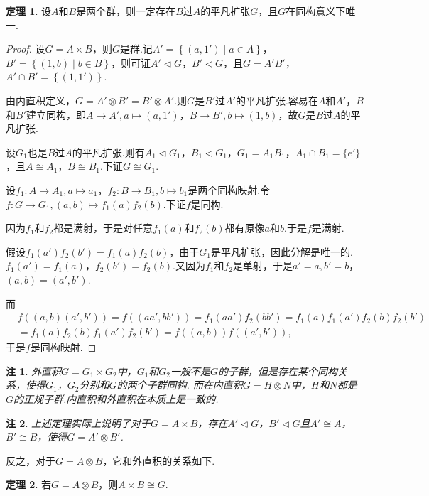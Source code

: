 \documentclass[12pt]{ctexart}
\theoremstyle{definition}
\newtheorem{theorem}{定理}
\theoremstyle{plain}
\newtheorem*{remark}{注}
\begin{document}
	\begin{theorem}
		设$A$和$B$是两个群，则一定存在$B$过$A$的平凡扩张$G$，且$G$在同构意义下唯一.
	\end{theorem}
	\begin{proof}
		设$G=A\times B$，则$G$是群.记$A'=\left\{(a,1')\mid a\in A\right\}$，$B'=\left\{(1,b)\mid b\in B\right\}$，则可证$A'\lhd G$，$B'\lhd G$，且$G=A'B'$，$A'\cap B'=\left\{(1,1')\right\}$.
		
		由内直积定义，$G=A'\otimes B'=B'\otimes A'$.则$G$是$B'$过$A'$的平凡扩张.容易在$A$和$A'$，$B$和$B'$建立同构，即$A\to A',a\mapsto(a,1')$，$B\to B',b\mapsto(1,b)$，故$G$是$B$过$A$的平凡扩张.
		
		设$G_1$也是$B$过$A$的平凡扩张.则有$A_1\lhd G_1$，$B_1\lhd G_1$，$G_1=A_1B_1$，$A_1\cap B_1=\{e'\}$，且$A\cong A_1$，$B\cong B_1$.下证$G\cong G_1$.
		
		设$f_1:A\to A_1,a\mapsto a_1$，$f_2:B\to B_1,b\mapsto b_1$是两个同构映射.令$f:G\to G_1,(a,b)\mapsto f_1(a)f_2(b)$.下证$f$是同构.
		
		因为$f_1$和$f_2$都是满射，于是对任意$f_1(a)$和$f_2(b)$都有原像$a$和$b$.于是$f$是满射.
		
		假设$f_1(a')f_2(b')=f_1(a)f_2(b)$，由于$G_1$是平凡扩张，因此分解是唯一的. $f_1(a')=f_1(a)$，$f_2(b')=f_2(b)$.又因为$f_1$和$f_2$是单射，于是$a'=a,b'=b$，$(a,b)=(a',b')$.
		
		而
		\begin{equation*}
			\begin{aligned}
				&f\left((a,b)(a',b')\right)=f\left((aa',bb')\right)=f_1(aa')f_2(bb')=f_1(a)f_1(a')f_2(b)f_2(b')\\
				&=f_1(a)f_2(b)f_1(a')f_2(b')=f\left((a,b)\right)f\left((a',b')\right),
			\end{aligned}
		\end{equation*}
		于是$f$是同构映射.
	\end{proof}
	\begin{remark}
		外直积$G=G_1\times G_2$中，$G_1$和$G_2$一般不是$G$的子群，但是存在某个同构关系，使得$G_1$，$G_2$分别和$G$的两个子群同构. 而在内直积$G=H\otimes N$中，$H$和$N$都是$G$的正规子群.内直积和外直积在本质上是一致的.
	\end{remark}
	\begin{remark}
		上述定理实际上说明了对于$G=A\times B$，存在$A'\lhd G$，$B'\lhd G$且$A'\cong A$，$B'\cong B$，使得$G=A'\otimes B'$.
	\end{remark}
	反之，对于$G=A\otimes B$，它和外直积的关系如下.
	\begin{theorem}
		若$G=A\otimes B$，则$A\times B\cong G$.
	\end{theorem}
\end{document}
